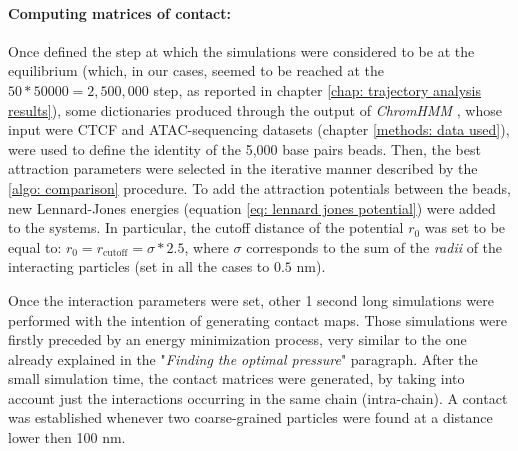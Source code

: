 
\paragraph{Computing matrices of contact:}

Once defined the step at which the simulations were considered to be at the equilibrium (which, in our cases, seemed to be reached at the $50 * 50000 = 2,500,000$ step, as reported in chapter \ref{chap: trajectory analysis results}), some dictionaries produced through the output of \textit{ChromHMM} 
\cite{chilledhousevibesLearningChromatinStates2015,ernstChromatinstateDiscoveryGenome2017}
, whose input were CTCF and ATAC-sequencing datasets (chapter \ref{methods: data used}), were used to define the identity of the 5,000 base pairs beads. Then, the best attraction parameters were selected in the iterative manner described by the \ref{algo: comparison} procedure. To add the attraction potentials between the beads, new Lennard-Jones energies (equation \ref{eq: lennard jones potential}) were added to the systems. In particular, the cutoff distance of the potential $r_0$ was set to be equal to: $r_0 = r_{\text{cutoff}} = \sigma * 2.5$, where $\sigma$ corresponds to the sum of the \textit{radii} of the interacting particles (set in all the cases to $0.5$ nm).


Once the interaction parameters were set, other 1 second long simulations were performed with the intention of generating contact maps. Those simulations were firstly preceded by an energy minimization process, very similar to the one already explained in the "\textit{Finding the optimal pressure}" paragraph. After the small simulation time, the contact matrices were generated, by taking into account just the interactions occurring in the same chain (intra-chain). A contact was established whenever two coarse-grained particles were found at a distance lower then 100 nm. %



